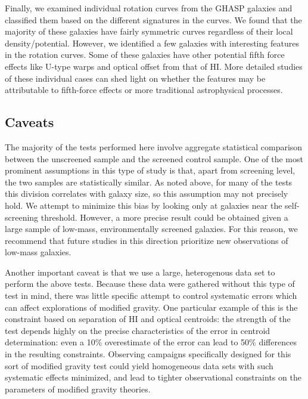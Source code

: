 \documentclass[useAMS,usenatbib,twocolumn]{mn2e}
\begin{document}
Finally, we examined individual rotation curves from the GHASP 
galaxies and classified them based on the different signatures 
in the curves. We found that the majority of these galaxies 
have fairly symmetric curves regardless
of their local density/potential. However, we identified a 
few galaxies with interesting features in the rotation curves.
Some of these galaxies have other potential fifth force effects
like U-type warps and optical offset from that of HI.
More detailed studies of these individual cases can shed light
on whether the features may be attributable to fifth-force effects or
more traditional astrophysical processes.

\subsection{Caveats}
\label{sec:caveat}
The majority of the tests performed here involve aggregate statistical
comparison between the unscreened sample and the screened control sample.
One of the most prominent assumptions in this type of study is that, apart
from screening level, the two samples are statistically similar.  As noted
above, for many of the tests this division correlates with galaxy size, so
this assumption may not precisely hold.  We attempt to minimize this bias
by looking only at galaxies near the self-screening threshold.  However,
a more precise result could be obtained given a large sample of low-mass,
environmentally screened galaxies.  For this reason, we recommend that
future studies in this direction prioritize new observations of low-mass
galaxies.

Another important caveat is that we use a large, heterogenous data set to
perform the above tests.  Because these data were gathered without this
type of test in mind, there was little specific attempt to control
systematic errors which can affect explorations of modified gravity.
One particular example of this is the constraint based on separation of
HI and optical centroids: the strength of the test depends highly on the
precise characteristics of the error in centroid determination: even a
10\% overestimate of the error can lead to 50\% differences in the
resulting constraints.  Observing campaigns specifically designed for this
sort of modified gravity test could yield homogeneous data sets with such
systematic effects minimized, and lead to tighter observational constraints
on the parameters of modified gravity theories.
\end{document}
